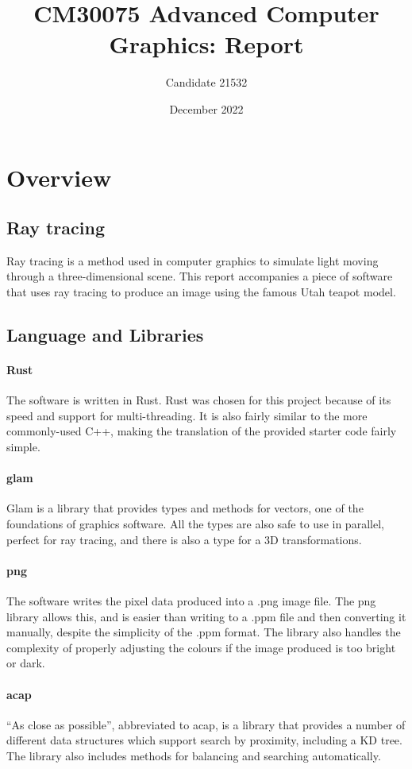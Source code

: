 \documentclass[a4paper]{article}
\title{CM30075 Advanced Computer Graphics: Report}
\author{Candidate 21532}
\date{December 2022}
\begin{document}
\maketitle
\tableofcontents

\section{Overview}
\subsection{Ray tracing}
Ray tracing is a method used in computer graphics to simulate light moving through a three-dimensional scene. This report accompanies a piece of software that uses ray tracing to produce an image using the famous Utah teapot model.

\subsection{Language and Libraries}
\paragraph{Rust} The software is written in Rust. Rust was chosen for this project because of its speed and support for multi-threading. It is also fairly similar to the more commonly-used C++, making the translation of the provided starter code fairly simple.

\paragraph{glam} Glam is a library that provides types and methods for vectors, one of the foundations of graphics software. All the types are also safe to use in parallel, perfect for ray tracing, and there is also a type for a 3D transformations.

\paragraph{png} The software writes the pixel data produced into a .png image file. The png library allows this, and is easier than writing to a .ppm file and then converting it manually, despite the simplicity of the .ppm format. The library also handles the complexity of properly adjusting the colours if the image produced is too bright or dark.

\paragraph{acap} ``As close as possible'', abbreviated to acap, is a library that provides a number of different data structures which support search by proximity, including a KD tree. The library also includes methods for balancing and searching automatically.
\end{document}
